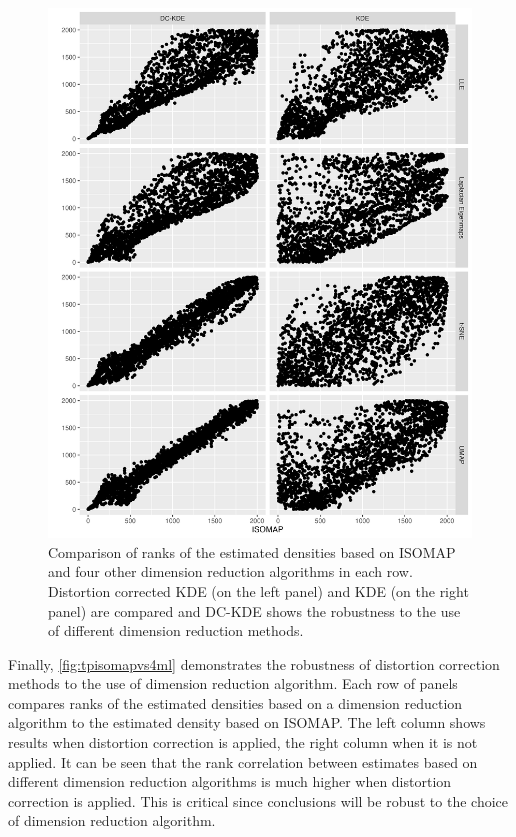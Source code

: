 \documentclass[11pt,a4paper,]{article}
\begin{document}
\begin{figure}

{\centering \includegraphics[width=0.95\linewidth]{figures/Twin Peak2000_density_compare_isomapvs4ml_radius8_r0_5_rank} 

}

\caption{Comparison of ranks of the estimated densities based on ISOMAP  and four other dimension reduction algorithms in each row. Distortion corrected KDE (on the left panel) and KDE (on the right panel) are compared and DC-KDE shows the robustness to the use of different dimension reduction methods.}\label{fig:tpisomapvs4ml}
\end{figure}

Finally, \autoref{fig:tpisomapvs4ml} demonstrates the robustness of distortion correction methods to the use of dimension reduction algorithm. Each row of panels compares ranks of the estimated densities based on a dimension reduction algorithm to the estimated density based on ISOMAP. The left column shows results when distortion correction is applied, the right column when it is not applied. It can be seen that the rank correlation between estimates based on different dimension reduction algorithms is much higher when distortion correction is applied. This is critical since conclusions will be robust to the choice of dimension reduction algorithm.
\end{document}
